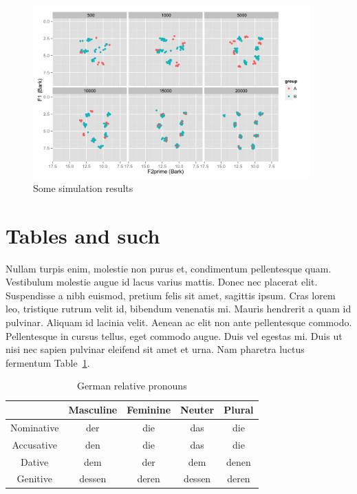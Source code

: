 \documentclass[10pt]{article}
\begin{document}
\begin{figure}[H]
\centering
    \includegraphics[width=0.95\textwidth]{VowelSpace.png}
  \caption{Some simulation results}
  \label{fig:simulation}
\end{figure}

\section{Tables and such}

Nullam turpis enim, molestie non purus et, condimentum pellentesque quam. Vestibulum molestie augue id lacus varius mattis. Donec nec placerat elit. Suspendisse a nibh euismod, pretium felis sit amet, sagittis ipsum. Cras lorem leo, tristique rutrum velit id, bibendum venenatis mi. Mauris hendrerit a quam id pulvinar. Aliquam id lacinia velit. Aenean ac elit non ante pellentesque commodo. Pellentesque in cursus tellus, eget commodo augue. Duis vel egestas mi. Duis ut nisi nec sapien pulvinar eleifend sit amet et urna. Nam pharetra luctus fermentum Table~\ref{tab:german}.

\begin{table}[H]
\caption{German relative pronouns}
\label{tab:german}
\centering
\begin{tabular}{c||c|c|c|c}
& Masculine & Feminine & Neuter & Plural\\
\hline \hline
Nominative & der & die & das & die\\
\hline
Accusative & den & die & das & die\\
\hline
Dative & dem & der & dem & denen\\
\hline
Genitive & dessen & deren & dessen & deren\\
\end{tabular}
\end{table}
\end{document}
